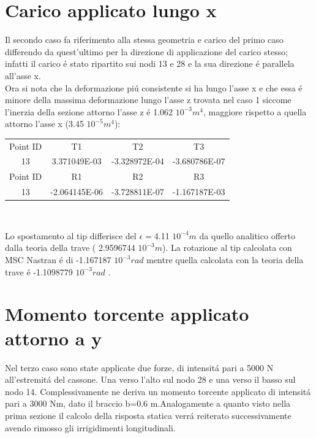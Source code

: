 \documentclass[12pt,a4paper]{article}
\begin{document}
\section{Carico applicato lungo x}
Il secondo caso fa riferimento alla stessa geometria e carico del primo caso differendo da quest'ultimo per la direzione di applicazione del carico stesso; infatti il carico \'e stato ripartito sui nodi 13 e 28 e la sua direzione \'e parallela
all'asse x.\\
Ora si nota che la deformazione pi\'u consistente si ha lungo l'asse x e che essa \'e minore della massima deformazione lungo l'asse z trovata nel caso 1 siccome l'inerzia della sezione attorno l'asse z \'e 1.062 $10^{-3} {m^4}$,
 maggiore rispetto a quella attorno l'asse x (3.45 $10^{-5} {m^4}$):\\
 \begin{center}
 \begin{tabular}{c c c c}
 \hline
 Point ID& T1 & T2 & T3\\
 13 & 3.371049E-03 & -3.328972E-04 & -3.680786E-07\\
 \hline
 Point ID & R1 & R2 & R3\\
 13 & -2.064145E-06 & -3.728811E-07 & -1.167187E-03\\
 \hline
 \end{tabular}\\ 
 \end{center}
Lo spostamento al tip differisce del $\epsilon=$4.11 $10^{-4} m$ da quello analitico offerto dalla teoria della trave ( 2.9596744 $10^{-3} m$). La rotazione al tip calcolata con MSC Nastran \'e di -1.167187 $10^{-3} rad$ mentre quella calcolata con la
teoria della trave \'e -1.1098779 $10^{-3} rad$ .

\section{Momento torcente applicato attorno a y}
Nel terzo caso sono state applicate due forze, di intensit\'a pari a 5000 N all'estremit\'a del cassone. Una verso l'alto sul nodo 28 e
una verso il basso sul nodo 14. Complessivamente ne deriva un momento torcente applicato di intensit\'a pari a  3000 Nm, dato il braccio b=0.6 m.Analogamente a quanto visto nella prima sezione il calcolo della risposta statica verr\'a reiterato successivamente avendo rimosso gli irrigidimenti longitudinali.
\end{document}
